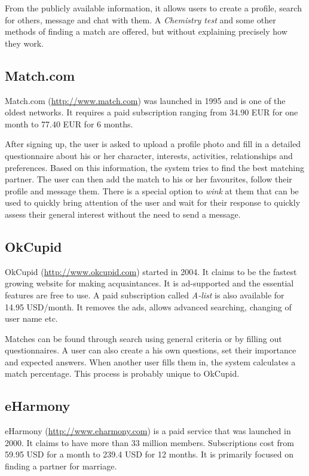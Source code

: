 \documentclass[12pt,oneside]{fithesis}
\begin{document}
		From the publicly available information, it allows users to create a profile, search for others, message and chat with them. A \emph{Chemistry test} and some other methods of finding a match are offered, but without explaining precisely how they work. \cite{website:pof}
		\subsection{Match.com}
		Match.com (\url{http://www.match.com}) was launched in 1995 and is one of the oldest networks. It requires a paid subscription ranging from 34.90 EUR for one month  to 77.40 EUR for 6 months.
		
		After signing up, the user is asked to upload a profile photo and fill in a detailed questionnaire about his or her character, interests, activities, relationships and preferences. Based on this information, the system tries to find the best matching partner. The user can then add the match to his or her favourites, follow their profile and message them. There is a special option to \emph{wink} at them that can be used to quickly bring attention of the user and wait for their response to quickly assess their general interest without the need to send a message. \cite{website:match}
		
		\subsection{OkCupid}
		OkCupid (\url{http://www.okcupid.com}) started in 2004. It claims to be the fastest growing website for making acquaintances.
		It is ad-supported and the essential features are free to use. A paid subscription called \emph{A-list} is also available for 14.95 USD/month. It removes the ads, allows advanced searching, changing of user name etc.
		
		Matches can be found through search using general criteria or by filling out questionnaires. A user can also create a his own questions, set their importance and expected answers. When another user fills them in, the system calculates a match percentage. This process is probably unique to OkCupid. \cite{website:okcupid}
		\subsection{eHarmony}
		eHarmony (\url{http://www.eharmony.com}) is a paid service that was launched in 2000. It claims to have more than 33 million members. Subscriptions cost from 59.95 USD for a month  to 239.4 USD for 12 months. It is primarily focused on finding a partner for marriage.
		
\end{document}

